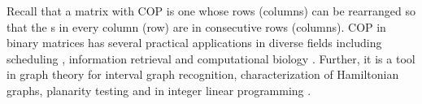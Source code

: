 



Recall that a matrix with COP is one whose rows (columns) can be
rearranged so that the {\un}s in every column (row) are in consecutive
rows (columns). %
COP in binary matrices has several practical applications
in diverse fields including scheduling \cite{hl06}, information
retrieval \cite{k77} and computational biology \cite{abh98}.  Further,
it is a tool in graph theory \cite{mcg04} for interval graph
recognition, characterization of Hamiltonian graphs, planarity testing
\cite{bl76} and in integer linear programming \cite{ht02,hl06}.


